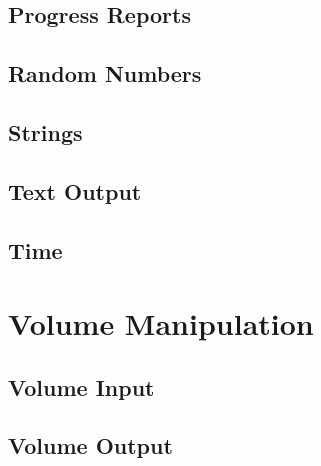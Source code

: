 \subsection{Progress Reports}

\subsection{Random Numbers}

\subsection{Strings}

\subsection{Text Output}

\subsection{Time}

\section{Volume Manipulation}

\subsection{Volume Input}

\subsection{Volume Output}


